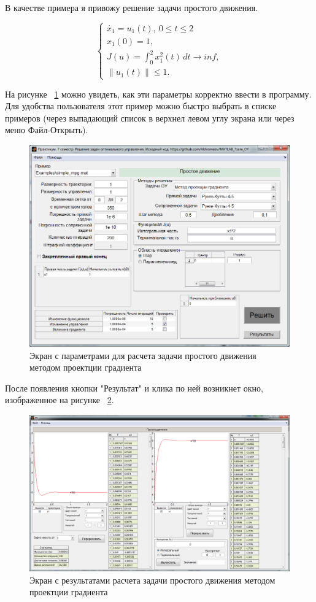 \documentclass[oneside,final,12pt]{extreport}
\begin{document}
В качестве примера я привожу решение задачи простого движения.

$$
\begin{cases}
\dot{x_1}=u_1(t), \ 0 \leqslant t \leqslant 2\\ 
x_1(0)=1,\\
J(u)=\int_0^2 x_1^2(t) \, dt\rightarrow inf,\\
\|u_1(t)\|\leqslant1.
\end{cases}
$$

На рисунке ~\ref {simpleMpgPic} можно увидеть, как эти параметры корректно ввести в программу. Для удобства пользователя этот пример можно быстро выбрать в списке примеров (через выпадающий список в верхнел левом углу экрана или через меню Файл-Открыть).

\begin{figure}[!h]
\centering
\includegraphics[scale=0.7]{simple_mpg.png}
\caption{Экран с параметрами для расчета задачи простого движения методом проектции градиента}
\label{simpleMpgPic}
\end{figure}

После появления кнопки "Результат" и клика по ней возникнет окно, изображенное на рисунке ~\ref {simpleMpgResPic}.
 
\begin{figure}[!h]
\centering
\includegraphics[scale=0.45]{simple_mpg_res.png}
\caption{Экран с результатами расчета задачи простого движения методом проектции градиента}
\label{simpleMpgResPic}
\end{figure}
\end{document}
